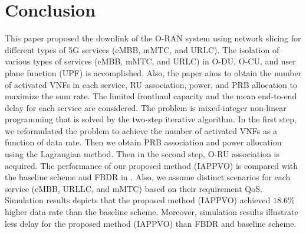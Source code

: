 \documentclass[conference]{IEEEtran}
\begin{document}
\section{Conclusion}\label{conc}
This paper proposed the downlink of the O-RAN system using network slicing for different types of 5G services (eMBB, mMTC, and URLC).
The isolation of various types of services (eMBB, mMTC, and URLC) in O-DU, O-CU, and user plane function (UPF) is accomplished.
Also, the paper aims to obtain the number of activated VNFs in each service, RU association, power, and PRB allocation to maximize the sum rate. The limited fronthaul capacity and the mean end-to-end delay for each service are considered. 
The problem is mixed-integer non-linear programming that is solved by the two-step iterative algorithm.
In the first step, we reformulated the problem to achieve the number of activated VNFs as a function of data rate. Then we obtain PRB association and power allocation using the Lagrangian method.
Then in the second step, O-RU association is acquired.
The performance of our proposed method (IAPPVO) is compared with the baseline scheme and FBDR in \cite{lee2018dynamic}. 
Also, we assume distinct scenarios for each service (eMBB, URLLC, and mMTC) based on their requirement QoS.
Simulation results depicts that the proposed method (IAPPVO) achieved $18.6\%$ higher data rate than the baseline scheme.
Moreover, simulation results illustrate less delay for the proposed method (IAPPVO) than FBDR and baseline scheme.

 

\end{document}
